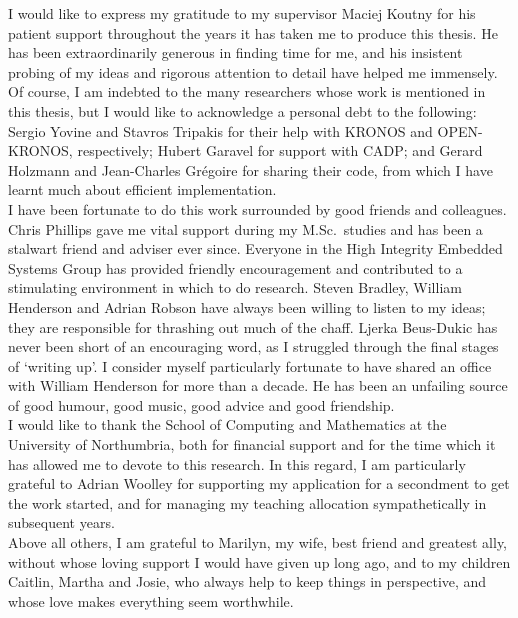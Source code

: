 \begin{acknowledgements}
I would like to express my gratitude to my supervisor Maciej Koutny
for his patient support throughout the years it has taken me to
produce this thesis. He has been extraordinarily generous in finding time
for me, and his insistent probing of my ideas and rigorous attention
to detail have helped me immensely.  \\


Of course, I am indebted to the many researchers whose work is
mentioned in this thesis, but I would like to acknowledge a personal
debt to the following: Sergio Yovine and Stavros Tripakis for their
help with KRONOS and OPEN-KRONOS, respectively; Hubert Garavel for
support with CADP; and Gerard Holzmann and Jean-Charles
Gr{\'e}goire for sharing their code, from which I have learnt much
about efficient implementation.  \\


I have been fortunate to do this work surrounded by good friends and
colleagues. Chris Phillips gave me vital support during my
\mbox{M.Sc. studies} and has been a stalwart friend and adviser ever
since. Everyone in the High Integrity Embedded Systems Group has
provided friendly encouragement and contributed to a stimulating
environment in which to do research. Steven Bradley, William Henderson
and Adrian Robson have always been willing to listen to my ideas; they
are responsible for thrashing out much of the chaff. Ljerka Beus-Dukic
has never been short of an encouraging word, as I struggled through
the final stages of `writing up'. I consider myself particularly
fortunate to have shared an office with William Henderson for more
than a decade. He has been an unfailing source of good humour, good
music, good advice and good friendship. \\


I would like to thank the School of Computing and Mathematics at the
University of Northumbria, both for financial support and for the time which
it has allowed me to devote to this research. In this regard, I am
particularly grateful to Adrian Woolley for supporting my application for
a secondment to get the work started, and for managing my teaching allocation
sympathetically in subsequent years. \\


Above all others, I am grateful to Marilyn, my wife, best friend and
greatest ally, without whose loving support I would have given up long
ago, and to my children Caitlin, Martha and Josie, who always help to
keep things in perspective, and whose love makes everything seem
worthwhile.  \\
\end{acknowledgements}
